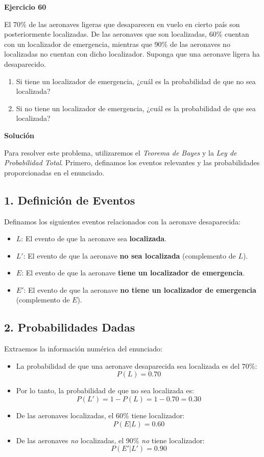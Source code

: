 \documentclass[a4paper]{article}
\begin{document}
\textbf{Ejercicio 60}

El 70\% de las aeronaves ligeras que desaparecen en vuelo en cierto país son posteriormente localizadas. De las aeronaves que son localizadas, 60\% cuentan con un localizador de emergencia, mientras que 90\% de las aeronaves no localizadas no cuentan con dicho localizador. Suponga que una aeronave ligera ha desaparecido.

\begin{enumerate}
    \item[\textbf{a.}] Si tiene un localizador de emergencia, ¿cuál es la probabilidad de que no sea localizada?
    \item[\textbf{b.}] Si no tiene un localizador de emergencia, ¿cuál es la probabilidad de que sea localizada?
\end{enumerate}

\vspace{0.5cm}

\textbf{Solución}

Para resolver este problema, utilizaremos el \textit{Teorema de Bayes} y la \textit{Ley de Probabilidad Total}. Primero, definamos los eventos relevantes y las probabilidades proporcionadas en el enunciado.

\subsection*{1. Definición de Eventos}

Definamos los siguientes eventos relacionados con la aeronave desaparecida:
\begin{itemize}
    \item $L$: El evento de que la aeronave sea \textbf{localizada}.
    \item $L'$: El evento de que la aeronave \textbf{no sea localizada} (complemento de $L$).
    \item $E$: El evento de que la aeronave \textbf{tiene un localizador de emergencia}.
    \item $E'$: El evento de que la aeronave \textbf{no tiene un localizador de emergencia} (complemento de $E$).
\end{itemize}

\subsection*{2. Probabilidades Dadas}

Extraemos la información numérica del enunciado:
\begin{itemize}
    \item La probabilidad de que una aeronave desaparecida sea localizada es del 70\%:
    $$ P(L) = 0.70 $$
    \item Por lo tanto, la probabilidad de que no sea localizada es:
    $$ P(L') = 1 - P(L) = 1 - 0.70 = 0.30 $$
    \item De las aeronaves localizadas, el 60\% tiene localizador:
    $$ P(E | L) = 0.60 $$
    \item De las aeronaves \textit{no} localizadas, el 90\% \textit{no} tiene localizador:
    $$ P(E' | L') = 0.90 $$
\end{itemize}
\end{document}
